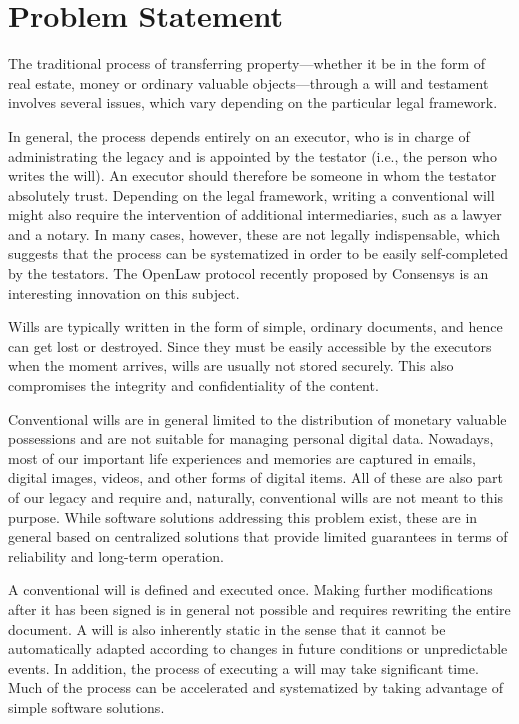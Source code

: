 \section{Problem Statement} %
\label{sec:problem_statement}

The traditional process of transferring property---whether it be in the form of real estate, money or ordinary valuable objects---through a will and testament involves several issues, which vary depending on the particular legal framework. 

In general, the process depends entirely on an executor, who is in charge of administrating the legacy and is appointed by the testator (i.e., the person who writes the will). An executor should therefore be someone in whom the testator absolutely trust. Depending on the legal framework, writing a conventional will might also require the intervention of additional  intermediaries, such as a lawyer and a notary. In many cases, however, these are not legally indispensable, which suggests that the process can be systematized in order to be easily self-completed by the testators. The OpenLaw protocol recently proposed by Consensys \cite{OpenLaw} is an interesting innovation on this subject. 

Wills are typically written in the form of simple, ordinary documents, and hence can get lost or destroyed. Since they must be easily accessible by the executors when the moment arrives, wills are usually not stored securely. This also compromises the integrity and confidentiality of the content.
  
Conventional wills are in general limited to the distribution of monetary valuable possessions and are not suitable for managing personal digital data. Nowadays, most of our important life experiences and memories are captured in emails, digital images, videos,  and other forms of digital items. All of these are also part of our legacy and require  and, naturally, conventional wills are not meant to this purpose. While software solutions addressing this problem exist, these are in general based on centralized solutions that provide limited guarantees in terms of reliability and long-term operation.

A conventional will is defined and executed once. Making further modifications after it has been signed is in general not possible and requires rewriting the entire document. A will is also inherently static in the sense that it cannot be automatically adapted according to changes in future conditions or unpredictable events. In addition, the process of executing a will may take significant time. Much of the process can be accelerated and systematized by taking advantage of simple software solutions. 

